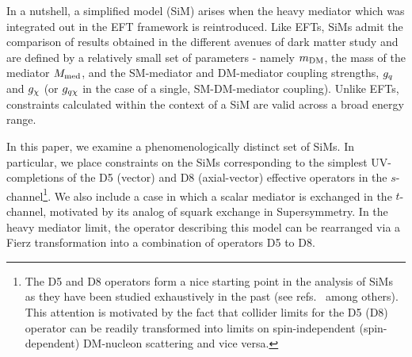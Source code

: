 In a nutshell, a simplified model (SiM) arises when the heavy mediator which was integrated out in the EFT framework is reintroduced. Like EFTs, SiMs admit the comparison of results obtained in the different avenues of dark matter study \cite{DiFranzo:2013vra, Buckley:2014fba} and are defined by a relatively small set of parameters - namely $m_{\mathrm{DM}}$, the mass of the mediator $M_{\mathrm{med}}$, and the SM-mediator and DM-mediator coupling strengths, $g_q$ and $g_{\chi}$ (or $g_{q \chi}$ in the case of a single, SM-DM-mediator coupling). Unlike EFTs, constraints calculated within the context of a SiM are valid across a broad energy range.

In this paper, we examine a phenomenologically distinct set of SiMs. In particular, we place constraints on the SiMs corresponding to the simplest UV-completions of the D5 (vector) and D8 (axial-vector) effective operators in the $s$-channel\footnote{The D5 and D8 operators form a nice starting point in the analysis of SiMs as they have been studied exhaustively in the past (see refs.~\cite{Aad:1363019, ATLAS-CONF-2012-147, CMS-PAS-EXO-12-048, Buckley:2013jwa, Abdallah:1472683, MonoX, ValidEFT, ValidEFT_part2, ValidEFT_part3} among others). This attention is motivated by the fact that collider limits for the D5 (D8) operator can be readily transformed into limits on spin-independent (spin-dependent) DM-nucleon scattering and vice versa.}. We also include a case in which a scalar mediator is exchanged in the $t$-channel, motivated by its analog of squark exchange in Supersymmetry. In the heavy mediator limit, the operator describing this model can be rearranged via a Fierz transformation into a combination of operators D5 to D8.

